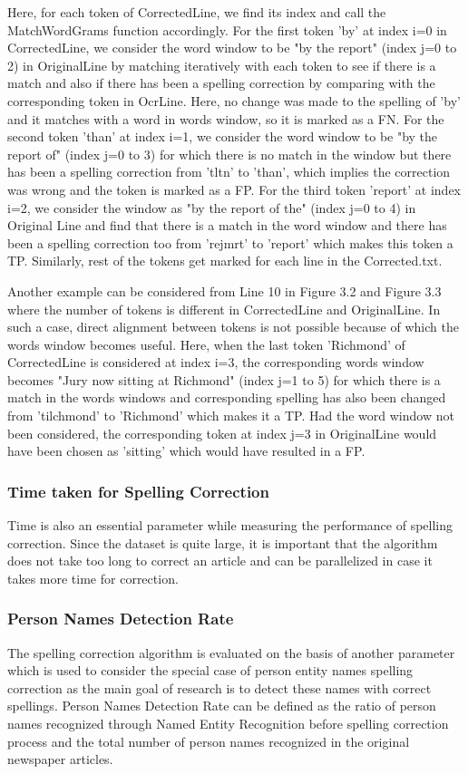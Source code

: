 \documentclass[letterpaper,11pt]{report}
\begin{document}
Here, for each token of CorrectedLine, we find its index and call the MatchWordGrams function accordingly. For the first token 'by' at index i=0 in CorrectedLine, we consider the word window to be "by the report" (index j=0 to 2) in OriginalLine by matching iteratively with each token to see if there is a match and also if there has been a spelling correction by comparing with the corresponding token in OcrLine. Here, no change was made to the spelling of 'by' and it matches with a word in words window, so it is marked as a FN. For the second token 'than' at index i=1, we consider the word window to be "by the report of" (index j=0 to 3) for which there is no match in the window but there has been a spelling correction from 'tltn' to 'than', which implies the correction was wrong and the token is marked as a FP. For the third token 'report' at index i=2, we consider the window as "by the report of the" (index j=0 to 4) in Original Line and find that there is a match in the word window and there has been a spelling correction too from 'rejmrt' to 'report' which makes this token a TP. Similarly, rest of the tokens get marked for each line in the Corrected.txt. 

Another example can be considered from Line 10 in Figure 3.2 and Figure 3.3 where the number of tokens is different in CorrectedLine and OriginalLine. In such a case, direct alignment between tokens is not possible because of which the words window becomes useful. Here, when the last token 'Richmond' of CorrectedLine is considered at index i=3, the corresponding words window becomes "Jury now sitting at Richmond" (index j=1 to 5) for which there is a match in the words windows and corresponding spelling has also been changed from 'tilchmond' to 'Richmond' which makes it a TP. Had the word window not been considered, the corresponding token at index j=3 in OriginalLine would have been chosen as 'sitting' which would have resulted in a FP. 
   

\subsubsection{Time taken for Spelling Correction}
Time is also an essential parameter while measuring the performance of spelling correction. Since the dataset is quite large, it is important that the algorithm does not take too long to correct an article and can be parallelized in case it takes more time for correction.

\subsubsection{Person Names Detection Rate}
The spelling correction algorithm is evaluated on the basis of another parameter which is used to consider the special case of person entity names spelling correction as the main goal of research is to detect these names with correct spellings.
Person Names Detection Rate can be defined as the ratio of person names recognized through Named Entity Recognition before spelling correction process and the total number of person names recognized in the original newspaper articles.
\end{document}
